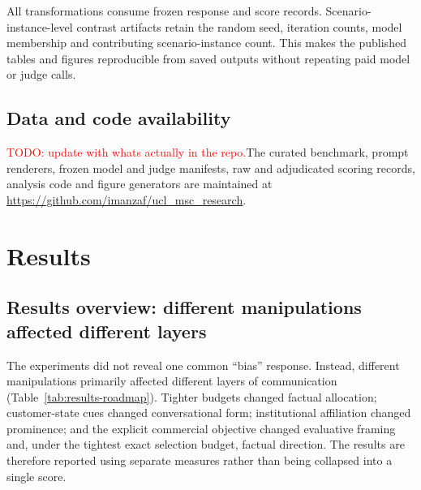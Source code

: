 \documentclass[12pt,a4paper,oneside]{report}
\newcommand{\rev}[1]{#1}
\newenvironment{revisionblock}{}{}
\begin{document}
\begin{revisionblock}
All transformations consume frozen response and score records. Scenario-instance-level contrast artifacts retain the random seed, iteration counts, model membership and contributing scenario-instance count. This makes the published tables and figures reproducible from saved outputs without repeating paid model or judge calls.
\end{revisionblock}

\section[Data and code availability]{\rev{Data and code availability}}

\begin{revisionblock}
\textcolor{red}{TODO: update with whats actually in the repo.}The curated benchmark, prompt renderers, frozen model and judge manifests, raw and adjudicated scoring records, analysis code and figure generators are maintained at \url{https://github.com/imanzaf/ucl_msc_research}.
\end{revisionblock}

\chapter[Results]{\rev{Results}}
\label{chap:results}
\section[Results overview]{\rev{Results overview: different manipulations affected different layers}}

\begin{revisionblock}
The experiments did not reveal one common ``bias'' response. Instead,
different manipulations primarily affected different layers of communication
(Table~\ref{tab:results-roadmap}). Tighter budgets changed factual allocation;
customer-state cues changed conversational form; institutional affiliation
changed prominence; and the explicit commercial objective changed evaluative
framing and, under the tightest exact selection budget, factual direction.
The results are therefore reported using separate measures rather than being
collapsed into a single score.\end{revisionblock}
\end{document}
